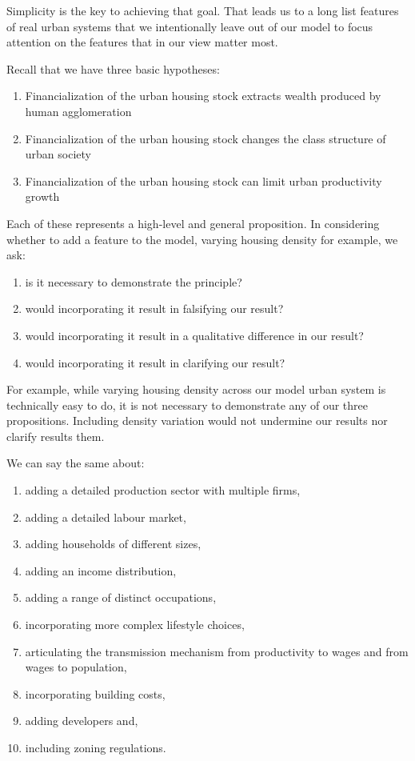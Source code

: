 Simplicity is the key to achieving that goal. That leads us to a long list features of real urban systems that we intentionally leave out of  our model to focus attention on the features that in our view matter most. 


Recall that we have three basic hypotheses:
\begin{enumerate}
    \item Financialization of the urban housing stock extracts wealth produced by human agglomeration 
    \item Financialization of the urban housing stock changes the class structure of urban society
    \item Financialization of the urban housing stock can limit urban productivity growth
\end{enumerate}
Each  of these represents a high-level and general proposition. In considering whether to add a feature to the model, varying housing density for example, we ask: 
\begin{enumerate}
    \item is it necessary to demonstrate the principle? 
    \item would incorporating it result in falsifying our result?
    \item would incorporating it result in a qualitative difference in our result?
    \item would incorporating it result in clarifying our result?
\end{enumerate}

For example, %
while varying housing density across our model urban system is technically easy to do, it is not necessary to demonstrate any of our three propositions. Including density variation would not undermine our results nor clarify results them. %

We can say the same about: 
\begin{enumerate}
    \item adding a detailed production sector with multiple firms,
    \item adding a detailed labour market,
    \item adding households of different sizes,
    \item adding an income distribution,
    \item adding a range of distinct occupations,
    \item incorporating more complex lifestyle choices,
    \item articulating the transmission mechanism from productivity to wages and from wages to population,
    \item incorporating building costs, 
    \item adding developers and,
    \item including zoning regulations. 
\end{enumerate}


